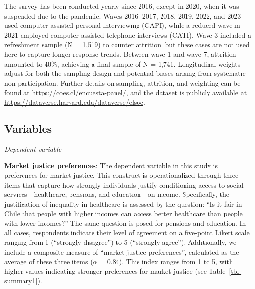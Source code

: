 \documentclass[
  12pt,
]{article}
\begin{document}
The survey has been conducted yearly since 2016, except in 2020, when it
was suspended due to the pandemic. Waves 2016, 2017, 2018, 2019, 2022,
and 2023 used computer-assisted personal interviewing (CAPI), while a
reduced wave in 2021 employed computer-assisted telephone interviews
(CATI). Wave 3 included a refreshment sample (N = 1,519) to counter
attrition, but these cases are not used here to capture longer response
trends. Between wave 1 and wave 7, attrition amounted to 40\%, achieving
a final sample of N = 1,741. Longitudinal weights adjust for both the
sampling design and potential biases arising from systematic
non-participation. Further details on sampling, attrition, and weighting
can be found at \url{https://coes.cl/encuesta-panel/}, and the dataset
is publicly available at
\url{https://dataverse.harvard.edu/dataverse/elsoc}.

\subsection{Variables}\label{variables}

\emph{Dependent variable}

\textbf{Market justice preferences}: The dependent variable in this
study is preferences for market justice. This construct is
operationalized through three items that capture how strongly
individuals justify conditioning access to social services---healthcare,
pensions, and education---on income. Specifically, the justification of
inequality in healthcare is assessed by the question: ``Is it fair in
Chile that people with higher incomes can access better healthcare than
people with lower incomes?'' The same question is posed for pensions and
education. In all cases, respondents indicate their level of agreement
on a five-point Likert scale ranging from 1 (``strongly disagree'') to 5
(``strongly agree''). Additionally, we include a composite measure of
``market justice preferences'', calculated as the average of these three
items (\(\alpha\) = 0.84). This index ranges from 1 to 5, with higher
values indicating stronger preferences for market justice (see
Table~\ref{tbl-summary1}).
\end{document}
